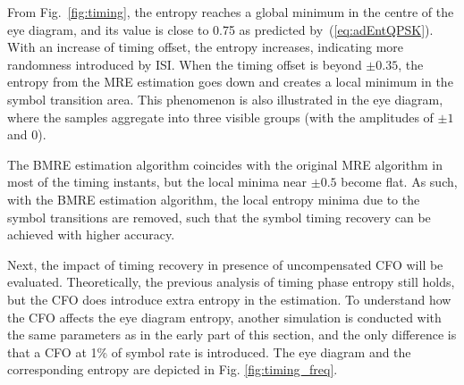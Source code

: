 \documentclass[journal,comsoc,onecolumn, 12pt,draftclsnofoot]{IEEEtran}
\begin{document}
From Fig.~\ref{fig:timing}, the entropy reaches a global minimum in the centre of the eye diagram, and its value is close to 0.75 as predicted by~(\ref{eq:adEntQPSK}).
With an increase of timing offset, the entropy increases, indicating  more randomness introduced by ISI.
When the timing offset is beyond $\pm 0.35$, the  entropy from the MRE estimation goes down and creates a local minimum in the symbol transition area. 
This phenomenon is also illustrated in the eye diagram, where the samples aggregate into three visible groups (with the amplitudes of \(\pm 1\) and 0).

The BMRE estimation algorithm coincides with the original MRE algorithm in most of the timing instants, but the local minima near $\pm0.5$ become flat.
As such, with the BMRE estimation algorithm, the local entropy minima due to the symbol transitions are removed, such that the symbol timing recovery can be achieved with higher accuracy.

Next, the impact of timing recovery in presence of uncompensated CFO will be evaluated.  
Theoretically, the previous analysis of timing phase entropy still holds, but the CFO does introduce extra entropy in the estimation.
To understand how the CFO affects the eye diagram entropy, another simulation is conducted with the same parameters as in the early part of this section,
and the only difference is that a CFO at 1\% of symbol rate is introduced.
The eye diagram and the corresponding entropy are depicted in Fig. \ref{fig:timing_freq}.
      
\end{document}
